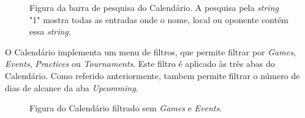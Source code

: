 \begin{figure}[h]
	\begin{center}
	\end{center}
	\caption{Figura da barra de pesquisa do Calendário. A pesquisa pela \textit{string} "1" mostra todas as entradas onde o nome, local ou oponente contém essa \textit{string}. }\label{fig:gamessortednameup}
\end{figure}
\newpage

O Calendário implementa um menu de filtros, que permite filtrar por \textit{Games}, \textit{Events}, \textit{Practices} ou \textit{Tournaments}. Este filtro é aplicado às três abas do Calendário. Como referido anteriormente, tambem permite filtrar o número de dias de alcance da aba \textit{Upcomming}.

\begin{figure}[h]
	\begin{center}
	\end{center}
	\caption{Figura do Calendário filtrado sem \textit{Games} e \textit{Events}. }\label{fig:calendarfiltergameevents}
\end{figure}

